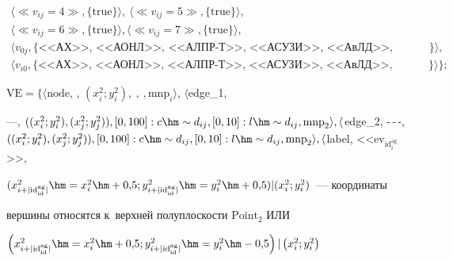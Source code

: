 \begin{multline*}
 \langle \ll v_{ij}=4\gg, \{ \mathrm{true}\}\rangle,\

\langle \ll v_{ij}=5\gg, \{ \mathrm{true}\}\rangle,\\

 \langle \ll v_{ij}=6 

\gg, \{ \mathrm{true}\}\rangle, \langle \ll v_{ij}=7 \gg, \{  \mathrm{true}\}\rangle,\\[-0.8pt]

\langle v_{0j}, \{ \mbox{<<АХ>>, <<АОНЛ>>, <<АЛПР-Т>>, 

<<АСУЗИ>>, <<АвЛД>>,  <<АСЛД>>}\} \rangle,\\[-0.5pt]

 \langle v_{i0}, \{ \mbox{<<АХ>>, <<АОНЛ>>, <<АЛПР-Т>>, <<АСУЗИ>>, <<АвЛД>>, <<АСЛД>>}\} \rangle 

 \Big\};

\end{multline*}



\vspace{-7.8pt}



\noindent

$\mathrm{VE}= 

  \Big\{ \langle \mathrm{node}$, , $(x_i^2; y_i^2), \ ,\ , \mathrm{mnp}_i \rangle$, $\langle$edge\_1,  

---, $((x_i^2; y_i^2), (x_j^2; y_j^2)), [0,100]: c\hm\sim d_{ij}, [0,10]: l\hm\sim d_{ij}, 

\mathrm{mnp}_2 \rangle, \langle$edge\_2, -\,-\,-, $((x_i^2; y_i^2), (x_j^2; y_j^2)), [0,100]: c\hm\sim 

d_{ij}, [0,10]: l\hm\sim d_{ij}, \mathrm{mnp}_2\rangle, \langle$label, <<$\mathrm{ev}_{\mathrm{id}_i^{\mathrm{ag}}}$>>, 

$(x^2_{i+\vert \mathrm{id}_{\mathrm{id}}^{\mathrm{ag}}\vert} \hm= x_i^2\hm+0{,}5; y^2_{i+\vert 

\mathrm{id}_{\mathrm{id}}^{\mathrm{ag}}\vert} \hm= y_i^2\hm+0{,}5)\vert (x_i^2; y_i^2)$~--- координаты 

вершины относятся к~верхней \mbox{полуплоскости} $\mathrm{Point}_2$ ИЛИ 

  $\left ( x^2_{i+\vert \mathrm{id}^{\mathrm{ag}}_{\mathrm{id}}\vert} \hm= x_i^2 \hm+0{,}5; y^2_{i+\vert 

\mathrm{id}_{\mathrm{id}}^{\mathrm{ag}}\vert} \hm= y_i^2\hm- 0{,}5\right) \vert \left( x_i^2; y_i^2\right)$ 

